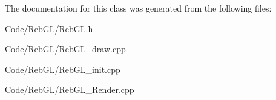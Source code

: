 The documentation for this class was generated from the following files\+:\begin{DoxyCompactItemize}
\item 
Code/\+Reb\+G\+L/Reb\+G\+L.\+h\item 
Code/\+Reb\+G\+L/Reb\+G\+L\+\_\+draw.\+cpp\item 
Code/\+Reb\+G\+L/Reb\+G\+L\+\_\+init.\+cpp\item 
Code/\+Reb\+G\+L/Reb\+G\+L\+\_\+\+Render.\+cpp\end{DoxyCompactItemize}
